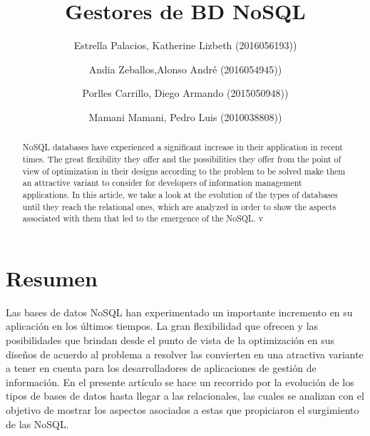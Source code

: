 \documentclass[preprint,12pt]{elsarticle}
\begin{document}
	
	\begin{frontmatter} 

		\title{\huge Gestores de BD NoSQL}
		
		\author{Estrella Palacios, Katherine Lizbeth      (2016056193))}
		\author{Andia Zeballos,Alonso André           	(2016054945))}
		\author{Porlles Carrillo, Diego Armando	         	(2015050948))}  
		\author{Mamani Mamani, Pedro Luis                 (2010038808))} 
		\address{Escuela Profesional de Ingeniería de Sistemas}
		\address{Universidad Privada de Tacna}
		\address{Tacna, Perú}
		

		\begin{abstract}
		
NoSQL databases have experienced a significant increase in their application in recent times. The great flexibility they offer and the possibilities they offer from the point of view of optimization in their designs according to the problem to be solved make them an attractive variant to consider for developers of information management applications. In this article, we take a look at the evolution of the types of databases until they reach the relational ones, which are analyzed in order to show the aspects associated with them that led to the emergence of the NoSQL. v

		\end{abstract}


	\end{frontmatter}


\section{Resumen}

Las bases de datos NoSQL han experimentado un importante incremento en su aplicación en los últimos tiempos. La gran flexibilidad que ofrecen y las posibilidades que brindan desde el punto de vista de la optimización en sus diseños de acuerdo al problema a resolver las convierten en una atractiva variante a tener en cuenta para los desarrolladores de aplicaciones de gestión de información. En el presente artículo se hace un recorrido por la evolución de los tipos de bases de datos hasta llegar a las relacionales, las cuales se analizan con el objetivo de mostrar los aspectos asociados a estas que propiciaron el surgimiento de las NoSQL.
\end{document}
